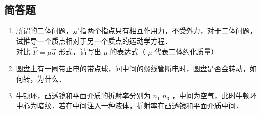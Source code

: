 \subsection{简答题}

\begin{enumerate}

\item 所谓的二体问题，是指两个指点只有相互作用力，不受外力，对于二体问题，试推导一个质点相对于另一个质点的运动学方程．\\
对比 $\vec{F} = \mu \vec{a}$ 形式，请写出 $\mu$ 的表达式（ $\mu$ 代表二体约化质量）

\item 圆盘上有一圈带正电的带点球，问中间的螺线管断电时，圆盘是否会转动，如何转，为什么．

\item 牛顿环，凸透镜和平面介质的折射率分别为 $n_1$ $n_3$ ，中间为空气，此时牛顿环中心为暗纹．若在中间注入一种液体，折射率在凸透镜和平面介质中间．

\end{enumerate}
